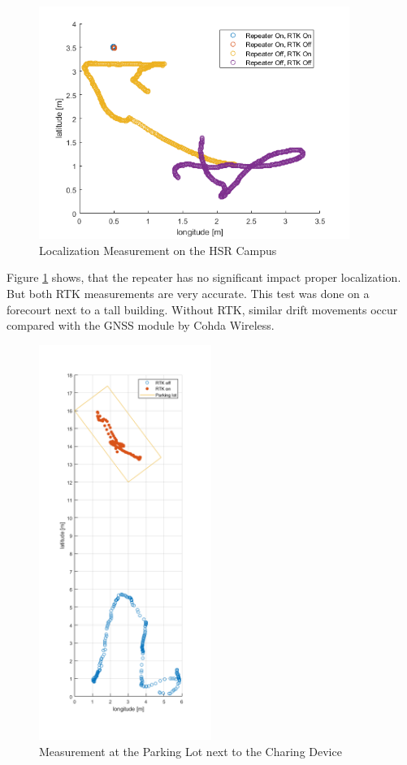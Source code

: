 \begin{figure}[htb]
	\centering
	\includegraphics[width=0.9\textwidth]{images/GPSDriftComparison}
	\caption{Localization Measurement on the HSR Campus}
	\label{fig:4comp}
\end{figure}

Figure \ref{fig:4comp} shows, that the repeater has no significant impact proper localization. But both RTK measurements are very accurate. This test was done on a forecourt next to a tall building. Without RTK, similar drift movements occur compared with the GNSS module by Cohda Wireless.

\clearpage
\pagebreak

\begin{figure}[htb]
	\centering
	\includegraphics[width=0.5\textwidth]{images/ppfitRTKOnOff}
	\caption{Measurement at the Parking Lot next to the Charing Device}
	\label{fig:ppfitRTK}
\end{figure}

